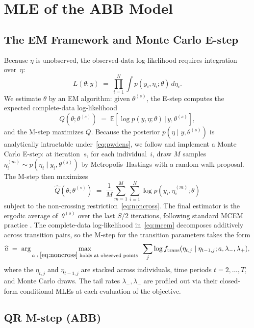 \documentclass[12pt]{article}
\begin{document}
\section{MLE of the ABB Model}
\label{sec:mle_abb}

\subsection{The EM Framework and Monte Carlo E-step}

Because $\eta$ is unobserved, the observed-data log-likelihood requires integration over~$\eta$:
\[
L(\theta; y) \;=\; \prod_{i=1}^{N} \int p(y_{i}, \eta_{i}; \theta)\, d\eta_{i}.
\]
We estimate $\theta$ by an EM algorithm: given $\theta^{(s)}$, the E-step computes the expected complete-data log-likelihood
\[
Q(\theta;\theta^{(s)}) \;=\; \mathbb{E}\!\left[\log p(y, \eta; \theta)\,\big|\, y, \theta^{(s)}\right],
\]
and the M-step maximizes $Q$. Because the posterior $p(\eta \mid y, \theta^{(s)})$ is analytically intractable under~\eqref{eq:pwdens}, we follow \citet{abb2017} and implement a Monte Carlo E-step: at iteration~$s$, for each individual~$i$, draw $M$ samples $\eta^{(m)}_{i} \sim p(\eta_{i} \mid y_{i}, \theta^{(s)})$ by Metropolis--Hastings with a random-walk proposal. The M-step then maximizes
\begin{equation}
\widehat{Q}(\theta;\theta^{(s)}) \;=\; \frac{1}{M} \sum_{m=1}^{M} \sum_{i=1}^{N} \log p(y_{i}, \eta^{(m)}_{i}; \theta)
\label{eq:mcem}
\end{equation}
subject to the non-crossing restriction~\eqref{eq:noncross}. The final estimator is the ergodic average of~$\theta^{(s)}$ over the last $S/2$ iterations, following standard MCEM practice \citep{weitanner1990}. The complete-data log-likelihood in~\eqref{eq:mcem} decomposes additively across transition pairs, so the M-step for the transition parameters takes the form
\begin{equation}
\widehat{a} \;=\; \arg\max_{a\; :\; \eqref{eq:noncross}\text{ holds at observed points}} \;\; \sum_{j} \log f_{\mathrm{trans}}(\eta_{t,j} \mid \eta_{t-1,j}; a, \lambda_{-}, \lambda_{+}),
\label{eq:mleobj}
\end{equation}
where the $\eta_{t,j}$ and $\eta_{t-1,j}$ are stacked across individuals, time periods $t=2,\dots,T$, and Monte Carlo draws. The tail rates $\lambda_{-}, \lambda_{+}$ are profiled out via their closed-form conditional MLEs at each evaluation of the objective.

\subsection{QR M-step (ABB)}
\end{document}
